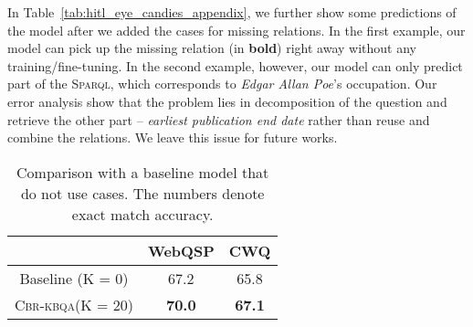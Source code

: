 \documentclass{article}
\newcommand{\spql}{\textsc{Sparql}\xspace}
\newcommand{\alg}{\textsc{Cbr-kbqa}\xspace}
\begin{document}
In Table~\ref{tab:hitl_eye_candies_appendix}, we further show some predictions of the model after we added the cases for missing relations. In the first example, our model can pick up the missing relation (in \textbf{bold}) right away without any training/fine-tuning. In the second example, however, our model can only predict part of the \spql, which corresponds to \textit{Edgar Allan Poe}'s occupation. Our error analysis show that the problem lies in decomposition of the question and retrieve the other part -- \textit{earliest publication end date} rather than reuse and combine the relations. We leave this issue for future works.

\begin{table}[]
    \centering
    \begin{tabular}{c c c}\toprule
          & WebQSP & CWQ  \\\midrule
         Baseline (K = 0) & 67.2 & 65.8 \\
         \alg (K = 20) & \textbf{70.0} & \textbf{67.1} \\\bottomrule
    \end{tabular}
    \caption{Comparison with a baseline model that do not use cases. The numbers denote exact match accuracy.}
    \label{tab:ablation_results_k=0}
\end{table}
\end{document}
